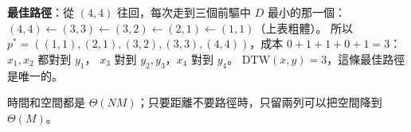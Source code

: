 \begin{pastsoln}
\textbf{最佳路徑}：從 $(4, 4)$ 往回，每次走到三個前驅中 $D$ 最小的那一個：$(4,4) \leftarrow (3,3)
\leftarrow (3,2) \leftarrow (2,1) \leftarrow (1,1)$（上表粗體）。 所以
$p^* = ((1,1), (2,1), (3,2), (3,3), (4,4))$，成本 $0 + 1 + 1 + 0 + 1 = 3$：$x_1, x_2$ 都對到 $y_1$，
$x_3$ 對到 $y_2, y_3$，$x_4$ 對到 $y_4$。 $\mathrm{DTW}(x, y) = 3$，這條最佳路徑是唯一的。

時間和空間都是 $\Theta(NM)$；只要距離不要路徑時，只留兩列可以把空間降到 $\Theta(M)$。
\end{pastsoln}
